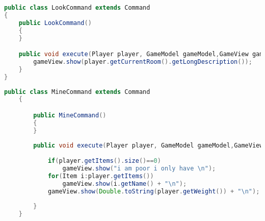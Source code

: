 \documentclass[a4paper , 10pt]{article}
\begin{document}
\begin{lstlisting}[language=Java, caption={Lookcommand}]
    public class LookCommand extends Command
{
    public LookCommand()
    {
    }

    public void execute(Player player, GameModel gameModel,GameView gameView){
        gameView.show(player.getCurrentRoom().getLongDescription());
    }
}

\end{lstlisting}
\begin{lstlisting}[language=Java, caption={Minecommand}]
    public class MineCommand extends Command
    {

        public MineCommand()
        {
        }
    
        public void execute(Player player, GameModel gameModel,GameView gameView){
           
            if(player.getItems().size()==0)
                gameView.show("i am poor i only have \n");
            for(Item i:player.getItems())
                gameView.show(i.getName() + "\n");
            gameView.show(Double.toString(player.getWeight()) + "\n");
            
        }
    }
\end{lstlisting}
\end{document}
